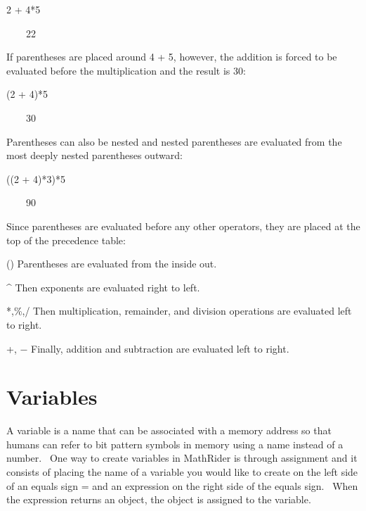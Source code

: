 \documentclass[12pt,twoside]{book}
\begin{document}
\bigskip

2 + 4*5

{\textbar}

\ \ \ \ 22


\bigskip

If parentheses are placed around 4 + 5, however, the addition is forced to be evaluated before the multiplication and the result is 30: 


(2 + 4)*5

{\textbar}

\ \ \ \ 30


\bigskip

Parentheses can also be nested and nested parentheses are evaluated from the most deeply nested parentheses outward: 

\bigskip

((2 + 4)*3)*5

{\textbar}

\ \ \ \ 90


\bigskip

Since parentheses are evaluated before any other operators, they are placed at the top of the precedence table: 

\bigskip

() Parentheses are evaluated from the inside out.


\bigskip

\^{} Then exponents are evaluated right to left.


\bigskip

*,\%,/ Then multiplication, remainder, and division operations are evaluated left to right. 

\bigskip

+, $-$ Finally, addition and subtraction are evaluated left to right.

\section[Variables]{Variables}

A variable is a name that can be associated with a memory address so that humans can refer to bit pattern symbols in memory using a name instead of a number. \ One way to create variables in MathRider is through assignment and it consists of placing the name of a variable you would like to create on the left side of an equals sign {\textquotesingle}={\textquotesingle} and an expression on the right side of the equals sign. \ When the expression returns an object, the object is assigned to the variable.
\end{document}
